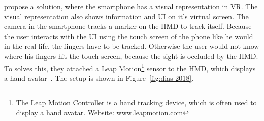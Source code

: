 \citeauthor{Dias.2018} propose a solution, where the smartphone has a visual representation in \ac{VR}. The visual representation also shows information and \ac{UI} on it's virtual screen. The camera in the smartphone tracks a marker on the \ac{HMD} to track itself. Because the user interacts with the \ac{UI} using the touch screen of the phone like he would in the real life, the fingers have to be tracked. Otherwise the user would not know where his fingers hit the touch screen, because the sight is occluded by the \ac{HMD}. To solves this, they attached a Leap Motion\footnote{The Leap Motion Controller is a hand tracking device, which is often used to display a hand avatar. Website: \href{https://www.leapmotion.com/}{www.leapmotion.com}} sensor to the \ac{HMD}, which displays a hand avatar~\cite{Dias.2018}. The setup is shown in Figure~\ref{fig:dias-2018}. 

